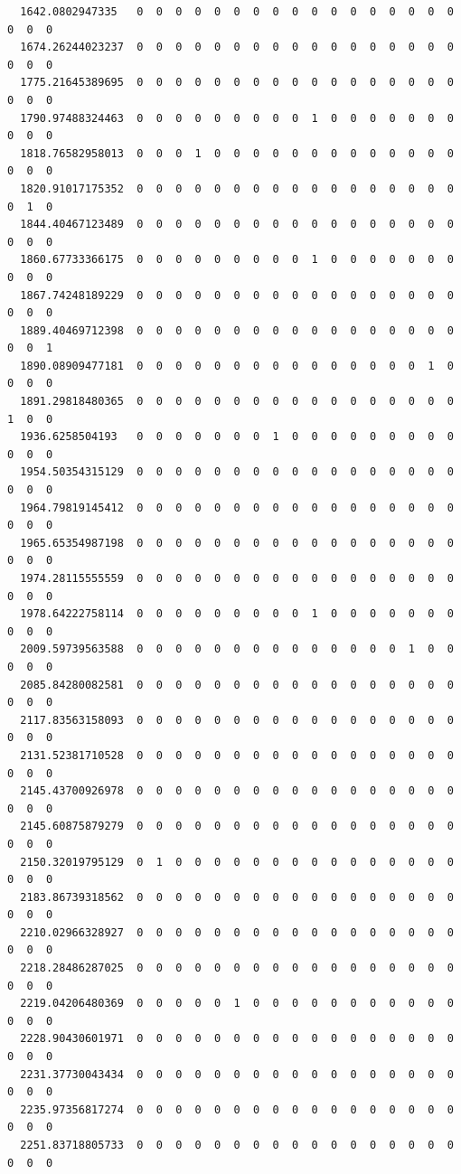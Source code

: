 \documentclass[
  letterpaper,
  DIV=11,
  numbers=noendperiod]{scrartcl}
\begin{document}
\begin{verbatim}
  1642.0802947335   0  0  0  0  0  0  0  0  0  0  0  0  0  0  0  0  0  0  0  0
  1674.26244023237  0  0  0  0  0  0  0  0  0  0  0  0  0  0  0  0  0  0  0  0
  1775.21645389695  0  0  0  0  0  0  0  0  0  0  0  0  0  0  0  0  0  0  0  0
  1790.97488324463  0  0  0  0  0  0  0  0  0  1  0  0  0  0  0  0  0  0  0  0
  1818.76582958013  0  0  0  1  0  0  0  0  0  0  0  0  0  0  0  0  0  0  0  0
  1820.91017175352  0  0  0  0  0  0  0  0  0  0  0  0  0  0  0  0  0  0  1  0
  1844.40467123489  0  0  0  0  0  0  0  0  0  0  0  0  0  0  0  0  0  0  0  0
  1860.67733366175  0  0  0  0  0  0  0  0  0  1  0  0  0  0  0  0  0  0  0  0
  1867.74248189229  0  0  0  0  0  0  0  0  0  0  0  0  0  0  0  0  0  0  0  0
  1889.40469712398  0  0  0  0  0  0  0  0  0  0  0  0  0  0  0  0  0  0  0  1
  1890.08909477181  0  0  0  0  0  0  0  0  0  0  0  0  0  0  0  1  0  0  0  0
  1891.29818480365  0  0  0  0  0  0  0  0  0  0  0  0  0  0  0  0  0  1  0  0
  1936.6258504193   0  0  0  0  0  0  0  1  0  0  0  0  0  0  0  0  0  0  0  0
  1954.50354315129  0  0  0  0  0  0  0  0  0  0  0  0  0  0  0  0  0  0  0  0
  1964.79819145412  0  0  0  0  0  0  0  0  0  0  0  0  0  0  0  0  0  0  0  0
  1965.65354987198  0  0  0  0  0  0  0  0  0  0  0  0  0  0  0  0  0  0  0  0
  1974.28115555559  0  0  0  0  0  0  0  0  0  0  0  0  0  0  0  0  0  0  0  0
  1978.64222758114  0  0  0  0  0  0  0  0  0  1  0  0  0  0  0  0  0  0  0  0
  2009.59739563588  0  0  0  0  0  0  0  0  0  0  0  0  0  0  1  0  0  0  0  0
  2085.84280082581  0  0  0  0  0  0  0  0  0  0  0  0  0  0  0  0  0  0  0  0
  2117.83563158093  0  0  0  0  0  0  0  0  0  0  0  0  0  0  0  0  0  0  0  0
  2131.52381710528  0  0  0  0  0  0  0  0  0  0  0  0  0  0  0  0  0  0  0  0
  2145.43700926978  0  0  0  0  0  0  0  0  0  0  0  0  0  0  0  0  0  0  0  0
  2145.60875879279  0  0  0  0  0  0  0  0  0  0  0  0  0  0  0  0  0  0  0  0
  2150.32019795129  0  1  0  0  0  0  0  0  0  0  0  0  0  0  0  0  0  0  0  0
  2183.86739318562  0  0  0  0  0  0  0  0  0  0  0  0  0  0  0  0  0  0  0  0
  2210.02966328927  0  0  0  0  0  0  0  0  0  0  0  0  0  0  0  0  0  0  0  0
  2218.28486287025  0  0  0  0  0  0  0  0  0  0  0  0  0  0  0  0  0  0  0  0
  2219.04206480369  0  0  0  0  0  1  0  0  0  0  0  0  0  0  0  0  0  0  0  0
  2228.90430601971  0  0  0  0  0  0  0  0  0  0  0  0  0  0  0  0  0  0  0  0
  2231.37730043434  0  0  0  0  0  0  0  0  0  0  0  0  0  0  0  0  0  0  0  0
  2235.97356817274  0  0  0  0  0  0  0  0  0  0  0  0  0  0  0  0  0  0  0  0
  2251.83718805733  0  0  0  0  0  0  0  0  0  0  0  0  0  0  0  0  0  0  0  0

\end{verbatim}
\end{document}
